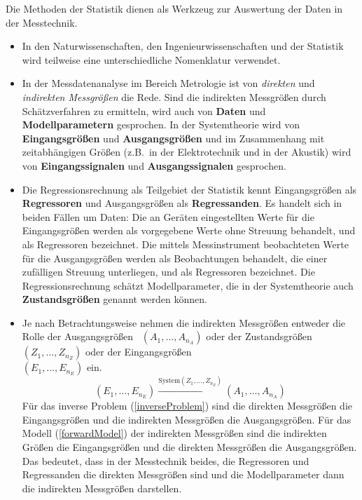 Die Methoden der Statistik dienen als Werkzeug zur Auswertung der Daten in der Messtechnik.
\begin{itemize}
	\item In den Naturwissenschaften, den Ingenieurwissenschaften und der Statistik wird
  teilweise eine unterschiedliche Nomenklatur verwendet.
	\item In der Messdatenanalyse im Bereich Metrologie ist von \textsl{direkten}
		und \textsl{indirekten Messgrößen} die Rede. Sind die indirekten Messgrößen durch
		Schätzverfahren zu ermitteln, wird auch von \textbf{Daten} und \textbf{Modellparametern}
		gesprochen.
		In der Systemtheorie wird von \textbf{Eingangsgrößen} und \textbf{Ausgangsgrößen}
		und im Zusammenhang mit zeitabhängigen Größen (z.B.\ in der Elektrotechnik und
		in der Akustik) wird von
		\textbf{Eingangssignalen} und \textbf{Ausgangssignalen} gesprochen.
	\item Die Regressionsrechnung als Teilgebiet der Statistik kennt Eingangsgrößen als
		\textbf{Regressoren} und Ausgangsgrößen als \textbf{Regressanden}.
			Es handelt sich in beiden Fällen um Daten: Die an Geräten eingestellten Werte für die
			Eingangsgrößen werden als vorgegebene Werte ohne Streuung behandelt, und als
			Regressoren bezeichnet. Die mittels Messinstrument beobachteten Werte für die Ausgangsgrößen
			werden als Beobachtungen behandelt, die einer zufälligen Streuung unterliegen, und
			als Regressoren bezeichnet. Die Regressionsrechnung schätzt Modellparameter, die in der
			Systemtheorie auch \textbf{Zustandsgrößen} genannt werden können.
	\item Je nach Betrachtungsweise nehmen die indirekten Messgrößen entweder
		die Rolle der \glqq Ausgangsgrößen\grqq ~ $(A_1, \dots, A_{n_A})$ oder
			der \glqq Zustandsgrößen\grqq ~ $(Z_1, \dots, Z_{n_Z})$
			oder der \glqq Eingangsgrößen\grqq \\ $(E_1, \dots, E_{n_E})$ ein.
\begin{equation}
(E_1, \dots, E_{n_E}) \xrightarrow{\mathrm{System} (Z_1, \dots, Z_{n_Z})} (A_1, \dots, A_{n_A})
\label{allgemeinSystem}
\end{equation}
			Für das inverse Problem (\ref{inverseProblem}) sind die direkten Messgrößen die Eingangsgrößen
			und die indirekten Messgrößen die Ausgangsgrößen. Für das Modell (\ref{forwardModel})
			der indirekten Messgrößen sind die indirekten Größen die Eingangsgrößen und die
			direkten Messgrößen die Ausgangsgrößen. Das bedeutet, dass in
			der Messtechnik beides, die Regressoren und Regressanden die direkten
			Messgrößen sind und die Modellparameter dann die indirekten Messgrößen darstellen.
\end{itemize}
